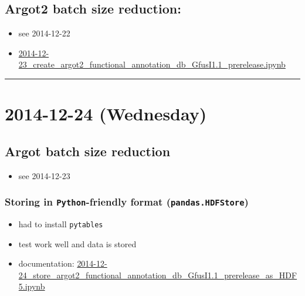 \documentclass[letterpaper]{scrartcl}
\begin{document}
\subsection{Argot2 batch size
reduction:}\label{argot2-batch-size-reduction-3}

\begin{itemize}
\itemsep1pt\parskip0pt
\item
  see 2014-12-22
\item
  \href{http://localhost:8888/jupiter/notebooks/YALE/ddrad58/2014-12-23_create_argot2_functional_annotation_db_GfusI1.1_prerelease.ipynb}{2014-12-23\_create\_argot2\_functional\_annotation\_db\_GfusI1.1\_prerelease.ipynb}
\end{itemize}

\begin{center}\rule{0.5\linewidth}{\linethickness}\end{center}

\section{2014-12-24 (Wednesday)}\label{wednesday}

\subsection{Argot batch size
reduction}\label{argot-batch-size-reduction}

\begin{itemize}
\itemsep1pt\parskip0pt
\item
  see 2014-12-23
\end{itemize}

\subsubsection{Storing in \texttt{Python}-friendly format
(\texttt{pandas.HDFStore})}\label{storing-in-python-friendly-format-pandas.hdfstore}

\begin{itemize}
\itemsep1pt\parskip0pt
\item
  had to install \texttt{pytables}
\item
  test work well and data is stored
\item
  documentation:
  \href{http://localhost:8888/jupiter/notebooks/YALE/ddrad58/2014-12-24_store_argot2_functional_annotation_db_GfusI1.1_prerelease_as_HDF5.ipynb}{2014-12-24\_store\_argot2\_functional\_annotation\_db\_GfusI1.1\_prerelease\_as\_HDF5.ipynb}
\end{itemize}
\end{document}
